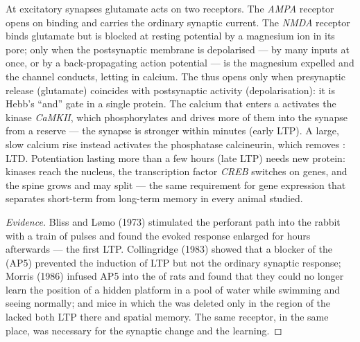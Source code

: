 \begin{proposition}\label{prop:b3:learning-memory:nmda}
At excitatory synapses glutamate acts on two receptors. The
\emph{AMPA} receptor opens on binding and carries the ordinary
synaptic current. The \emph{NMDA} receptor binds glutamate but is
blocked at resting potential by a magnesium ion in its pore; only when
the postsynaptic membrane is depolarised --- by many inputs at once, or
by a back-propagating action potential --- is the magnesium expelled
and the channel conducts, letting in calcium. The  thus
opens only when presynaptic release (glutamate) coincides with
postsynaptic activity (depolarisation): it is Hebb's ``and'' gate in a
single protein. The calcium that enters a \emph{}
activates the kinase \emph{CaMKII}, which phosphorylates 
and drives more of them into the synapse from a reserve --- the synapse
is stronger within minutes (early LTP). A large, slow calcium rise
instead activates the phosphatase calcineurin, which removes : LTD. Potentiation lasting more than a few hours (late LTP)
needs new protein: kinases reach the nucleus, the transcription factor
\emph{CREB} switches on genes, and the spine grows and may split ---
the same requirement for gene expression that separates short-term
from long-term memory in every animal studied.
\end{proposition}

\begin{proof}[Evidence]
Bliss and L\o mo (1973) stimulated the perforant path into the
rabbit  with a train of pulses and found the evoked
response enlarged for hours afterwards --- the first LTP. Collingridge
(1983) showed that a blocker of the  (AP5) prevented the
induction of LTP but not the ordinary synaptic response; Morris (1986)
infused AP5 into the  of rats and found that they could no
longer learn the position of a hidden platform in a pool of water while
swimming and seeing normally; and mice in which the  was
deleted only in the  region of the  lacked both LTP there
and spatial memory. The same receptor, in the same place, was necessary
for the synaptic change and the learning.
\end{proof}

